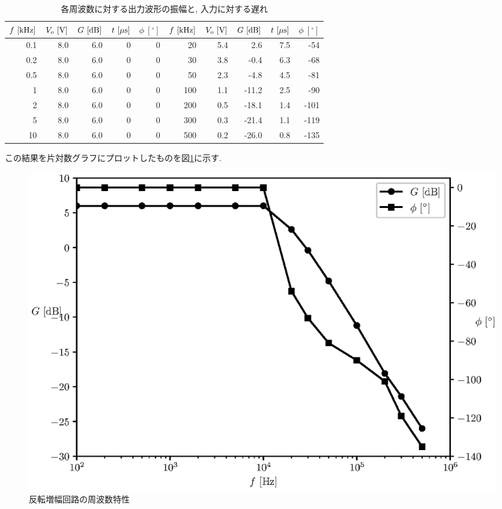 \documentclass[titlepage]{jsarticle}
\begin{document}
        \begin{table}[h]
            \caption{各周波数に対する出力波形の振幅と, 入力に対する遅れ}
            \label{tab:inv-amp}
            \centering
            \begin{tabular}{r|rr|rr||r|rr|rr}
                $f \ [\rm{kHz}]$ & $V_o \ [\rm{V]}$ & $G \ [\rm{dB}]$ & $t \ [\mu\rm{s}]$ & $\phi \ [^\circ]$ & $f \ [\rm{kHz}]$ & $V_o \ [\rm{V]}$ & $G \ [\rm{dB}]$ & $t \ [\mu\rm{s}]$ & $\phi \ [^\circ]$ \\ \hline \hline
                0.1 & 8.0 & 6.0 & 0 & 0 & 20 & 5.4 & 2.6 & 7.5 & -54 \\
                0.2 & 8.0 & 6.0 & 0 & 0 & 30 & 3.8 & -0.4 & 6.3 & -68 \\
                0.5 & 8.0 & 6.0 & 0 & 0 & 50 & 2.3 & -4.8 & 4.5 & -81 \\
                1 & 8.0 & 6.0 & 0 & 0 & 100 & 1.1 & -11.2 & 2.5 & -90 \\
                2 & 8.0 & 6.0 & 0 & 0 & 200 & 0.5 & -18.1 & 1.4 & -101 \\
                5 & 8.0 & 6.0 & 0 & 0 & 300 & 0.3 & -21.4 & 1.1 & -119 \\
                10 & 8.0 & 6.0 & 0 & 0 & 500 & 0.2 & -26.0 & 0.8 & -135 \\
            \end{tabular}
        \end{table}

        この結果を片対数グラフにプロットしたものを図\ref{fig:inv-amp-graph}に示す.

        \begin{figure}[h]
            \centering
            \includegraphics[width=0.8\hsize]{img/inv-amp-graph.eps}
            \caption{反転増幅回路の周波数特性}
            \label{fig:inv-amp-graph}
        \end{figure}
\end{document}
